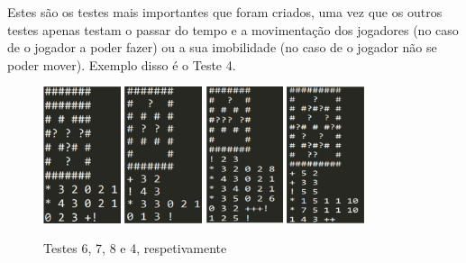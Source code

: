 \documentclass[a4paper]{report}
\begin{document}
Estes são os testes mais importantes que foram criados, uma vez que os outros testes apenas testam o passar do tempo e a movimentação dos jogadores (no caso de o jogador a poder fazer) ou a sua imobilidade (no caso de o jogador não se poder mover).
Exemplo disso é o Teste 4.
\begin{figure}[hb]
\begin{center}
    \includegraphics[height=4cm]{Teste6.png} \quad
    \includegraphics[height=4cm]{Teste7.png} \quad
	\includegraphics[height=4cm]{Teste8.png} \quad
	\includegraphics[height=4cm]{Teste4.png}
\caption{Testes 6, 7, 8 e 4, respetivamente} \label{gdimotes}
\end{center}
\end{figure}
\end{document}
